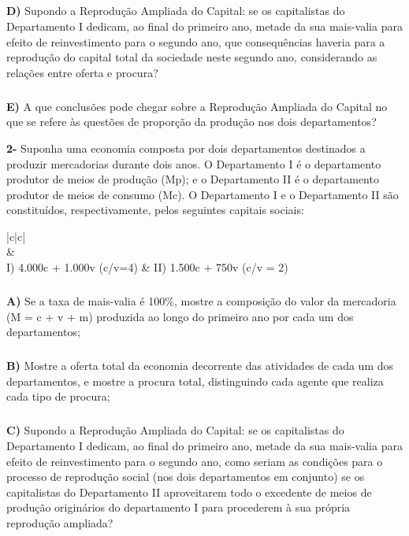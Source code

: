 \documentclass[a4paper, 12pt]{article} %
\begin{document}
\subparagraph{} \textbf{D)} Supondo a Reprodução Ampliada do Capital: se os capitalistas do Departamento I dedicam, ao
final do primeiro ano, metade da sua mais-valia para efeito de reinvestimento para o segundo
ano, que consequências haveria para a reprodução do capital total da sociedade neste segundo
ano, considerando as relações entre oferta e procura?

\subparagraph{} \textbf{E)} A que conclusões pode chegar sobre a Reprodução Ampliada do Capital no que se refere às
questões de proporção da produção nos dois departamentos?

\vspace{0.5cm}

\par \textbf{2-}  Suponha uma economia composta por dois departamentos destinados a produzir mercadorias
durante dois anos. O Departamento I é o departamento produtor de meios de produção (Mp); e o
Departamento II é o departamento produtor de meios de consumo (Mc). O Departamento I e o
Departamento II são constituídos, respectivamente, pelos seguintes capitais sociais:


\vspace{0.5cm}
\begin{center}
	\begin{tabular}{|c|c|}
		\hline {} {} \\
		\hline {} &  \\
		\hline I) 4.000c + 1.000v  (c/v=4) & II)  1.500c + 750v (c/v = 2) \\
		\hline
	\end{tabular}
\end{center}

\subparagraph{} \textbf{A)} Se a taxa de mais-valia é 100\%, mostre a composição do valor da mercadoria (M = c + v + m)
produzida ao longo do primeiro ano por cada um dos departamentos;

\subparagraph{} \textbf{B)} Mostre a oferta total da economia decorrente das atividades de cada um dos departamentos, e
mostre a procura total, distinguindo cada agente que realiza cada tipo de procura;

\subparagraph{} \textbf{C)} Supondo a Reprodução Ampliada do Capital: se os capitalistas do Departamento I dedicam, ao
final do primeiro ano, metade da sua mais-valia para efeito de reinvestimento para o segundo
ano, como seriam as condições para o processo de reprodução social (nos dois departamentos
em conjunto) se os capitalistas do Departamento II aproveitarem todo o excedente de meios
de produção originários do departamento I para procederem à sua própria reprodução
ampliada?
\end{document}
